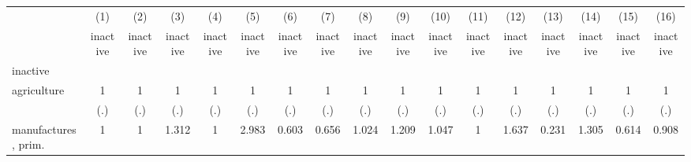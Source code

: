 {
\def\sym#1{\ifmmode^{#1}\else\(^{#1}\)\fi}
\begin{tabular}{l*{16}{c}}
\hline\hline
                    &\multicolumn{1}{c}{(1)}&\multicolumn{1}{c}{(2)}&\multicolumn{1}{c}{(3)}&\multicolumn{1}{c}{(4)}&\multicolumn{1}{c}{(5)}&\multicolumn{1}{c}{(6)}&\multicolumn{1}{c}{(7)}&\multicolumn{1}{c}{(8)}&\multicolumn{1}{c}{(9)}&\multicolumn{1}{c}{(10)}&\multicolumn{1}{c}{(11)}&\multicolumn{1}{c}{(12)}&\multicolumn{1}{c}{(13)}&\multicolumn{1}{c}{(14)}&\multicolumn{1}{c}{(15)}&\multicolumn{1}{c}{(16)}\\
                    &\multicolumn{1}{c}{inactive}&\multicolumn{1}{c}{inactive}&\multicolumn{1}{c}{inactive}&\multicolumn{1}{c}{inactive}&\multicolumn{1}{c}{inactive}&\multicolumn{1}{c}{inactive}&\multicolumn{1}{c}{inactive}&\multicolumn{1}{c}{inactive}&\multicolumn{1}{c}{inactive}&\multicolumn{1}{c}{inactive}&\multicolumn{1}{c}{inactive}&\multicolumn{1}{c}{inactive}&\multicolumn{1}{c}{inactive}&\multicolumn{1}{c}{inactive}&\multicolumn{1}{c}{inactive}&\multicolumn{1}{c}{inactive}\\
\hline
inactive            &                     &                     &                     &                     &                     &                     &                     &                     &                     &                     &                     &                     &                     &                     &                     &                     \\
agriculture         &           1         &           1         &           1         &           1         &           1         &           1         &           1         &           1         &           1         &           1         &           1         &           1         &           1         &           1         &           1         &           1         \\
                    &         (.)         &         (.)         &         (.)         &         (.)         &         (.)         &         (.)         &         (.)         &         (.)         &         (.)         &         (.)         &         (.)         &         (.)         &         (.)         &         (.)         &         (.)         &         (.)         \\
[1em]
manufactures, prim. &           1         &           1         &       1.312         &           1         &       2.983         &       0.603         &       0.656         &       1.024         &       1.209         &       1.047         &           1         &       1.637         &       0.231         &       1.305         &       0.614         &       0.908         \\

\end{tabular}}
